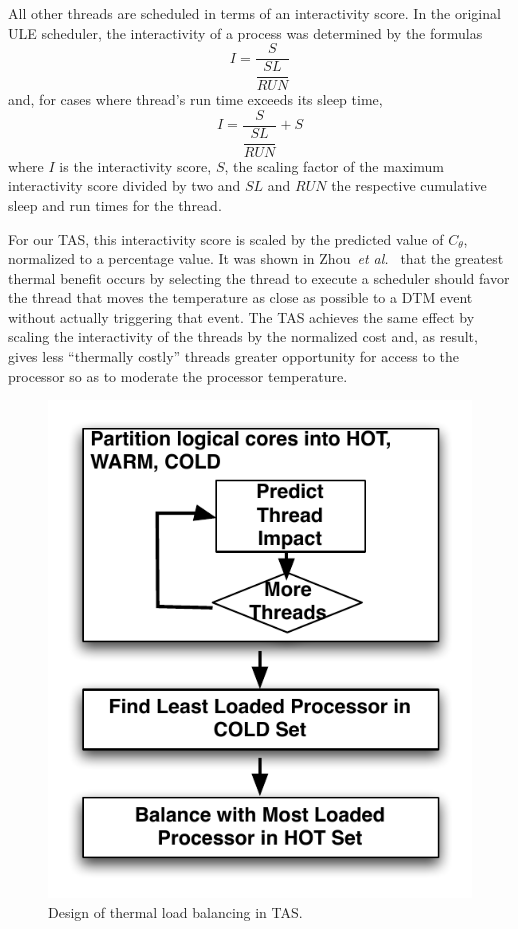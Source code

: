 \documentclass[times, 10pt,twocolumn]{IEEEtran}
\begin{document}
All other threads are scheduled in terms of an interactivity score.  In
the original ULE scheduler, the interactivity of a process was
determined by the formulas
\begin{equation}
  \label{eq:interactsleeprun} I = \dfrac{S}{\dfrac{SL}{RUN}}
\end{equation} and, for cases where thread's run time exceeds its sleep
time,
\begin{equation}
  \label{eq:interactrunsleep} I = \dfrac{S}{\dfrac{SL}{RUN}}+S
\end{equation} where $I$ is the interactivity score, $S$, the scaling
factor of the maximum interactivity score divided by two and $SL$ and
$RUN$ the respective cumulative sleep and run times for the thread.

For our TAS, this interactivity score is scaled by the predicted value
of $C_{\theta}$, normalized to a percentage value.  It was shown in
Zhou~\textit{et al.\ } \cite{Zhou2010b} that the greatest thermal
benefit occurs by selecting the thread to execute a scheduler should
favor the thread that moves the temperature as close as possible to a
DTM event without actually triggering that event.  The TAS achieves the
same effect by scaling the interactivity of the threads by the
normalized cost and, as result, gives less ``thermally costly'' threads
greater opportunity for access to the processor so as to moderate the
processor temperature.

\begin{figure}[t] \centering
  \includegraphics[scale=0.7]{tbalance.pdf}
  \caption{Design of thermal load balancing in TAS.}
  \label{fig:thermbal}
\end{figure}
\end{document}
